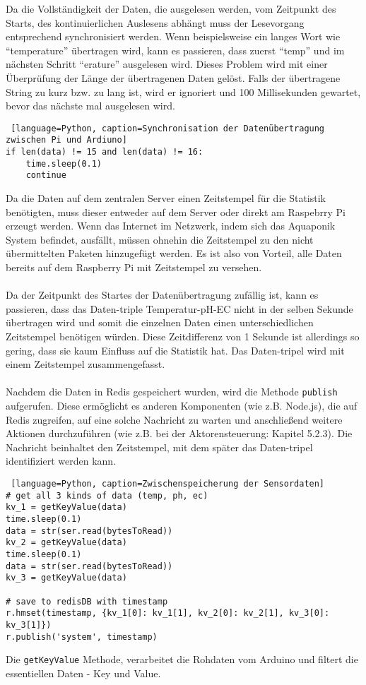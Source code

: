 Da die Vollständigkeit der Daten, die ausgelesen werden, vom Zeitpunkt des Starts, des kontinuierlichen Auslesens abhängt muss der Lesevorgang entsprechend synchronisiert werden. Wenn beispielsweise ein langes Wort wie "`temperature"' übertragen wird, kann es passieren, dass zuerst "`temp"' und im nächsten Schritt "`erature"' ausgelesen wird. Dieses Problem wird mit einer Überprüfung der Länge der übertragenen Daten gelöst. Falls der übertragene String zu kurz bzw. zu lang ist, wird er ignoriert und 100 Millisekunden gewartet, bevor das nächste mal ausgelesen wird. 
\begin{lstlisting} [language=Python, caption=Synchronisation der Datenübertragung zwischen Pi und Ardiuno]
if len(data) != 15 and len(data) != 16:
    time.sleep(0.1)
    continue
\end{lstlisting}
\newpage
Da die Daten auf dem zentralen Server einen Zeitstempel für die Statistik benötigten, muss dieser entweder auf dem Server oder direkt am Raspebrry Pi erzeugt werden. Wenn das Internet im Netzwerk, indem sich das Aquaponik System befindet, ausfällt, müssen ohnehin die Zeitstempel zu den nicht übermittelten Paketen hinzugefügt werden. Es ist also von Vorteil, alle Daten bereits auf dem Raspberry Pi mit Zeitstempel zu versehen. \\ \mbox{} \\
Da der Zeitpunkt des Startes der Datenübertragung zufällig ist, kann es passieren, dass das Daten-triple Temperatur-pH-EC nicht in der selben Sekunde übertragen wird und somit die einzelnen Daten einen unterschiedlichen Zeitstempel benötigen würden. Diese Zeitdifferenz von 1 Sekunde ist allerdings so gering, dass sie kaum Einfluss auf die Statistik hat. Das Daten-tripel wird mit einem Zeitstempel zusammengefasst. \\ \mbox{} \\
Nachdem die Daten in Redis gespeichert wurden, wird die Methode \texttt{publish} aufgerufen. Diese ermöglicht es anderen Komponenten (wie z.B. Node.js), die auf Redis zugreifen, auf eine solche Nachricht zu warten und anschließend weitere Aktionen durchzuführen (wie z.B. bei der Aktorensteuerung: Kapitel 5.2.3). Die Nachricht beinhaltet den Zeitstempel, mit dem später das Daten-tripel identifiziert werden kann. 
\begin{lstlisting} [language=Python, caption=Zwischenspeicherung der Sensordaten]
# get all 3 kinds of data (temp, ph, ec)
kv_1 = getKeyValue(data)
time.sleep(0.1)
data = str(ser.read(bytesToRead))
kv_2 = getKeyValue(data)
time.sleep(0.1)
data = str(ser.read(bytesToRead))
kv_3 = getKeyValue(data)

# save to redisDB with timestamp
r.hmset(timestamp, {kv_1[0]: kv_1[1], kv_2[0]: kv_2[1], kv_3[0]: kv_3[1]})
r.publish('system', timestamp)
\end{lstlisting}
\vspace{-0.5cm}
Die \texttt{getKeyValue} Methode, verarbeitet die Rohdaten vom Arduino und filtert die essentiellen Daten - Key und Value.

